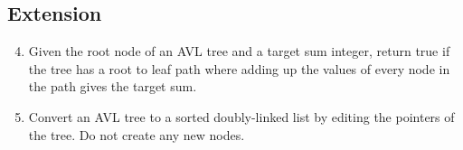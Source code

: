 \documentclass{article}
\begin{document}
\subsection*{Extension}


\begin{enumerate}


\setcounter{enumi}{3}

\item Given the root node of an AVL tree and a target sum integer, return true if the tree has a root to leaf path where adding up the values of every node in the path gives the target sum.


\item Convert an AVL tree to a sorted doubly-linked list by editing the pointers of the tree.  Do not create any new nodes.


\end{enumerate}

\clearpage

\end{document}
